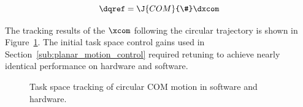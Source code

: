 \begin{equation}
	\dqref = \J{COM}{\#} \dxcom
	\label{eq:jcomcirc}
\end{equation}

The tracking results of the $\xcom$ following the circular trajectory is shown in Figure~\ref{fig:comcirctracking}. The initial task space control gains used in Section~\ref{sub:planar_motion_control} required retuning to achieve nearly identical performance on hardware and software. 

\begin{figure}[!h]
	\begin{center}
	\end{center}
  	\caption{Task space tracking of circular COM motion in software and hardware.}
	\label{fig:comcirctracking}
\end{figure} 

